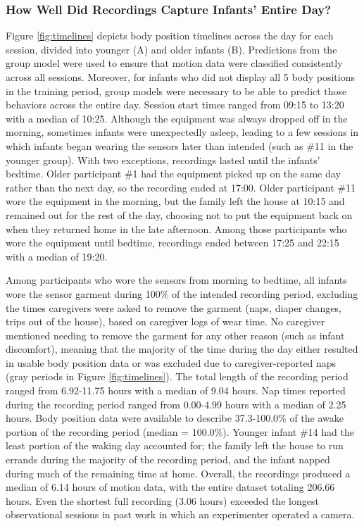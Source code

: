 \documentclass[
  man]{apa6}
\begin{document}
\hypertarget{how-well-did-recordings-capture-infants-entire-day}{%
\subsubsection{How Well Did Recordings Capture Infants' Entire Day?}\label{how-well-did-recordings-capture-infants-entire-day}}

Figure \ref{fig:timelines} depicts body position timelines across the day for each session, divided into younger (A) and older infants (B). Predictions from the group model were used to ensure that motion data were classified consistently across all sessions. Moreover, for infants who did not display all 5 body positions in the training period, group models were necessary to be able to predict those behaviors across the entire day. Session start times ranged from 09:15 to 13:20 with a median of 10:25. Although the equipment was always dropped off in the morning, sometimes infants were unexpectedly asleep, leading to a few sessions in which infants began wearing the sensors later than intended (such as \#11 in the younger group). With two exceptions, recordings lasted until the infants' bedtime. Older participant \#1 had the equipment picked up on the same day rather than the next day, so the recording ended at 17:00. Older participant \#11 wore the equipment in the morning, but the family left the house at 10:15 and remained out for the rest of the day, choosing not to put the equipment back on when they returned home in the late afternoon. Among those participants who wore the equipment until bedtime, recordings ended between 17:25 and 22:15 with a median of 19:20.

Among participants who wore the sensors from morning to bedtime, all infants wore the sensor garment during 100\% of the intended recording period, excluding the times caregivers were asked to remove the garment (naps, diaper changes, trips out of the house), based on caregiver logs of wear time. No caregiver mentioned needing to remove the garment for any other reason (such as infant discomfort), meaning that the majority of the time during the day either resulted in usable body position data or was excluded due to caregiver-reported naps (gray periods in Figure \ref{fig:timelines}). The total length of the recording period ranged from 6.92-11.75 hours with a median of 9.04 hours. Nap times reported during the recording period ranged from 0.00-4.99 hours with a median of 2.25 hours. Body position data were available to describe 37.3-100.0\% of the awake portion of the recording period (median = 100.0\%). Younger infant \#14 had the least portion of the waking day accounted for; the family left the house to run errands during the majority of the recording period, and the infant napped during much of the remaining time at home. Overall, the recordings produced a median of 6.14 hours of motion data, with the entire dataset totaling 206.66 hours. Even the shortest full recording (3.06 hours) exceeded the longest observational sessions in past work in which an experimenter operated a camera.
\end{document}
